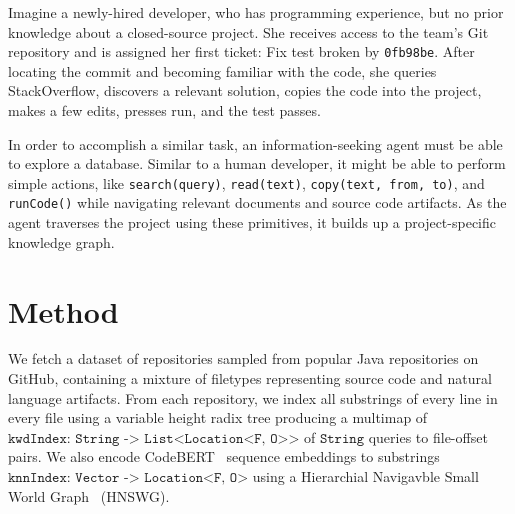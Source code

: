\documentclass[11pt]{article}
\begin{document}
Imagine a newly-hired developer, who has programming experience, but no prior knowledge about a closed-source project. She receives access to the team's Git repository and is assigned her first ticket: Fix test broken by \texttt{0fb98be}. After locating the commit and becoming familiar with the code, she queries StackOverflow, discovers a relevant solution, copies the code into the project, makes a few edits, presses run, and the test passes.

In order to accomplish a similar task, an information-seeking agent must be able to explore a database. Similar to a human developer, it might be able to perform simple actions, like \texttt{search(query)}, \texttt{read(text)}, \texttt{copy(text, from, to)}, and \texttt{runCode()} while navigating relevant documents and source code artifacts. As the agent traverses the project using these primitives, it builds up a project-specific knowledge graph.



\section{Method}



We fetch a dataset of repositories sampled from popular Java repositories on GitHub, containing a mixture of filetypes representing source code and natural language artifacts. From each repository, we index all substrings of every line in every file using a variable height radix tree producing a multimap of $\texttt{kwdIndex: String -> List<Location<F, O>>}$ of $\texttt{String}$  queries to file-offset pairs. We also encode CodeBERT~\cite{feng2020codebert} sequence embeddings to substrings $\texttt{knnIndex: Vector -> Location<F, O>}$ using a Hierarchial Navigavble Small World Graph~\cite{malkov2018efficient} (HNSWG).
\end{document}
